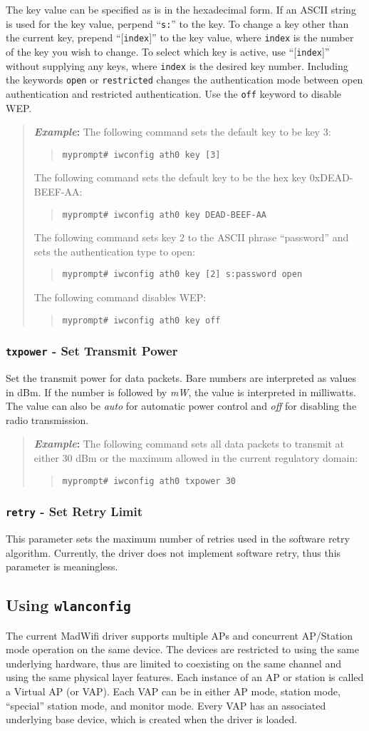 \documentclass[10pt,fullpage]{article}
\newcommand{\mytt}[1]{{\texttt{#1}}}
\newcommand{\bv}{\begin{verse}}
\newcommand{\ev}{\end{verse}}
\newcommand{\cmd}[1]{{\texttt{myprompt\# #1}}}
\newcommand{\clival}[1]{{\emph{#1}}}
\newenvironment{example}{\begin{quote}\textbf{\textit{Example}:}}{\end{quote}}
\begin{document}
The key value can be specified as is in the hexadecimal form.  If an
ASCII string is used for the key value, perpend ``\mytt{s:}'' to the
key.  To change a key other than the current key, prepend
``[\mytt{index}]'' to the key value, where \mytt{index} is the number of
the key you wish to change.  To select which key is active, use
``[\mytt{index}]'' without supplying any keys, where \mytt{index} is the
desired key number.   Including the keywords \mytt{open} or
\mytt{restricted} changes the authentication mode between open
authentication and restricted authentication.  Use the \mytt{off}
keyword to disable WEP.
\begin{example}
  The following command sets the default key to be key 3:
  \bv
  \cmd{iwconfig ath0 key [3]}
  \ev
  The following command sets the default key to be the hex key
  0xDEAD-BEEF-AA:
  \bv
  \cmd{iwconfig ath0 key DEAD-BEEF-AA}
  \ev
  The following command sets key 2 to the ASCII phrase ``password''
  and sets the authentication type to open:
  \bv
  \cmd{iwconfig ath0 key [2] s:password open}
  \ev
  The following command disables WEP:
  \bv
  \cmd{iwconfig ath0 key off}
  \ev
\end{example}

\subsubsection{\mytt{txpower} - Set Transmit Power}
Set the transmit power for data packets.  Bare numbers are interpreted
as values in dBm.  If the number is followed by \clival{mW}, the value
is interpreted in milliwatts.  The value can also be \clival{auto} for
automatic power control and \clival{off} for disabling the radio
transmission.
\begin{example}
  The following command sets all data packets to transmit at either 30
  dBm or the maximum allowed in the current regulatory domain:
  \bv
  \cmd{iwconfig ath0 txpower 30}
  \ev
\end{example}

\subsubsection{\mytt{retry} - Set Retry Limit}
This parameter sets the maximum number of retries used in the software
retry algorithm.  Currently, the driver does not implement software
retry, thus this parameter is meaningless.

\subsection{Using \mytt{wlanconfig}}
\label{sec:wlanconfig}
The current MadWifi driver supports multiple APs and concurrent
AP/Station mode operation on the same device.  The devices are
restricted to using the same underlying hardware, thus are limited to
coexisting on the same channel and using the same physical layer
features.  Each instance of an AP or station is called a Virtual AP
(or VAP). Each VAP can be in either AP mode, station mode, ``special''
station mode, and monitor mode.  Every VAP has an associated
underlying base device, which is created when the driver is loaded.
\end{document}
